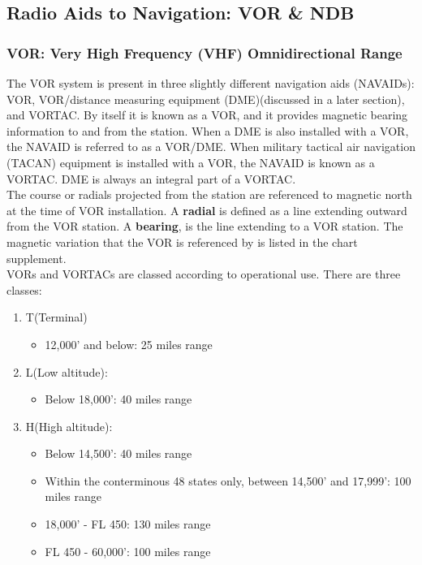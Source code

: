 \documentclass[12pt]{article}
\begin{document}
	\subsection{Radio Aids to Navigation: VOR \& NDB}
		\subsubsection{VOR: Very High Frequency (VHF) Omnidirectional Range}
			The VOR system is present in three slightly different navigation aids (NAVAIDs): VOR, VOR/distance measuring equipment (DME)(discussed in a later section), and VORTAC. By itself it is known as a VOR, and it provides magnetic bearing information to and from the station. When a DME is also installed with a VOR, the NAVAID is referred to as a VOR/DME. When military tactical air navigation (TACAN) equipment is installed with a VOR, the NAVAID is known as a VORTAC. DME is always an integral part of a VORTAC.\\

			The course or radials projected from the station are referenced to magnetic north at the time of VOR installation. A \textbf{radial} is defined as a line extending outward from the VOR station. A \textbf{bearing}, is the line extending to a VOR station. The magnetic variation that the VOR is referenced by is listed in the chart supplement.\\

			VORs and VORTACs are classed according to operational use. There are three classes:
			\begin{enumerate}
				\item T(Terminal)
					\begin{itemize} \item 12,000' and below: 25 miles range \end{itemize}
				\item L(Low altitude):
					\begin{itemize} \item Below 18,000': 40 miles range \end{itemize}
				\item H(High altitude): 
					\begin{itemize}
						\item Below 14,500': 40 miles range
						\item Within the conterminous 48 states only, between 14,500' and 17,999': 100 miles range
						\item 18,000' - FL 450: 130 miles range
						\item FL 450 - 60,000': 100 miles range
					\end{itemize}
			\end{enumerate}
\end{document}
